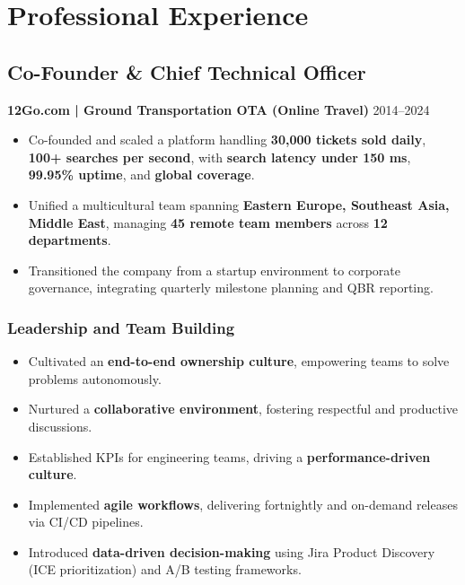 \documentclass[11pt,a4paper]{article}
\begin{document}
\section*{Professional Experience}

\subsection*{Co-Founder \& Chief Technical Officer}
\textbf{12Go.com | Ground Transportation OTA (Online Travel)} \hfill 2014--2024
\begin{itemize}
    \item Co-founded and scaled a platform handling \textbf{30,000 tickets sold daily}, \textbf{100+ searches per second}, with \textbf{search latency under 150 ms}, \textbf{99.95\% uptime}, and \textbf{global coverage}.
    \item Unified a multicultural team spanning \textbf{Eastern Europe, Southeast Asia, Middle East}, managing \textbf{45 remote team members} across \textbf{12 departments}.
    \item Transitioned the company from a startup environment to corporate governance, integrating quarterly milestone planning and QBR reporting.
\end{itemize}

\subsubsection*{Leadership and Team Building}
\begin{itemize}
    \item Cultivated an \textbf{end-to-end ownership culture}, empowering teams to solve problems autonomously.
    \item Nurtured a \textbf{collaborative environment}, fostering respectful and productive discussions.
    \item Established KPIs for engineering teams, driving a \textbf{performance-driven culture}.
    \item Implemented \textbf{agile workflows}, delivering fortnightly and on-demand releases via CI/CD pipelines.
    \item Introduced \textbf{data-driven decision-making} using Jira Product Discovery (ICE prioritization) and A/B testing frameworks.
\end{itemize}
\end{document}
